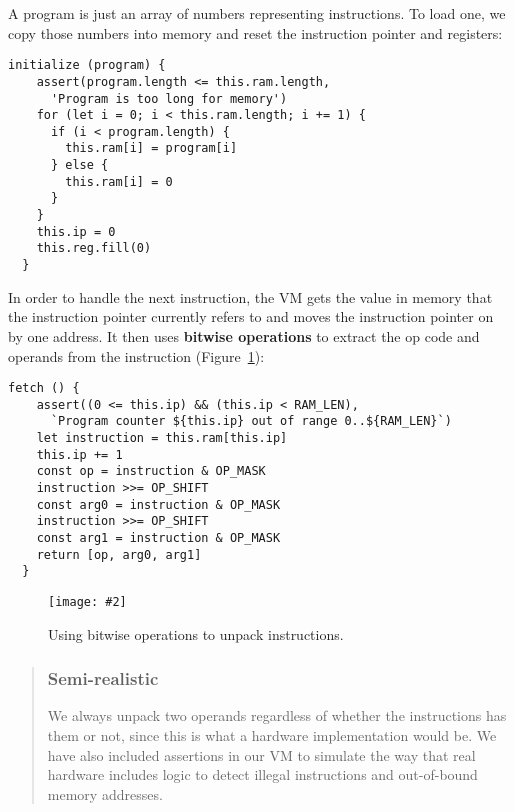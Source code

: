 \documentclass[krantzl]{krantz}
\newcommand{\figpdfhere}[4]{\begin{figure}[h]%
\centering%
\texttt{[image: \#2]}%
\caption{#3}%
\label{#1}%
\end{figure}}
\newcommand{\figref}[1]{Figure~\ref{#1}}
\newcommand{\glossref}[1]{\textbf{#1}}
\newenvironment{callout}{\savenotes\begin{tBox}\begin{quotation}\toggletrue{inbox}\renewcommand{\thempfootnote}{\arabic{footnote}}}{\end{quotation}\vspace{\baselineskip}\end{tBox}\togglefalse{inbox}\spewnotes}
\begin{document}
A program is just an array of numbers representing instructions.
To load one,
we copy those numbers into memory and reset the instruction pointer and registers:


\begin{lstlisting}[frame=tblr]
  initialize (program) {
    assert(program.length <= this.ram.length,
      'Program is too long for memory')
    for (let i = 0; i < this.ram.length; i += 1) {
      if (i < program.length) {
        this.ram[i] = program[i]
      } else {
        this.ram[i] = 0
      }
    }
    this.ip = 0
    this.reg.fill(0)
  }
\end{lstlisting}



In order to handle the next instruction,
the VM gets the value in memory that the instruction pointer currently refers to
and moves the instruction pointer on by one address.
It then uses \glossref{bitwise operations}
to extract the op code and operands from the instruction
(\figref{virtual-machine-unpacking}):


\begin{lstlisting}[frame=tblr]
  fetch () {
    assert((0 <= this.ip) && (this.ip < RAM_LEN),
      `Program counter ${this.ip} out of range 0..${RAM_LEN}`)
    let instruction = this.ram[this.ip]
    this.ip += 1
    const op = instruction & OP_MASK
    instruction >>= OP_SHIFT
    const arg0 = instruction & OP_MASK
    instruction >>= OP_SHIFT
    const arg1 = instruction & OP_MASK
    return [op, arg0, arg1]
  }
\end{lstlisting}


\figpdfhere{virtual-machine-unpacking}{./virtual-machine/unpacking.pdf}{Using bitwise operations to unpack instructions.}{0.6}

\begin{callout}


\subsubsection*{Semi-realistic}


We always unpack two operands regardless of whether the instructions has them or not,
since this is what a hardware implementation would be.
We have also included assertions in our VM
to simulate the way that real hardware includes logic
to detect illegal instructions and out-of-bound memory addresses.

\end{callout}
\end{document}
